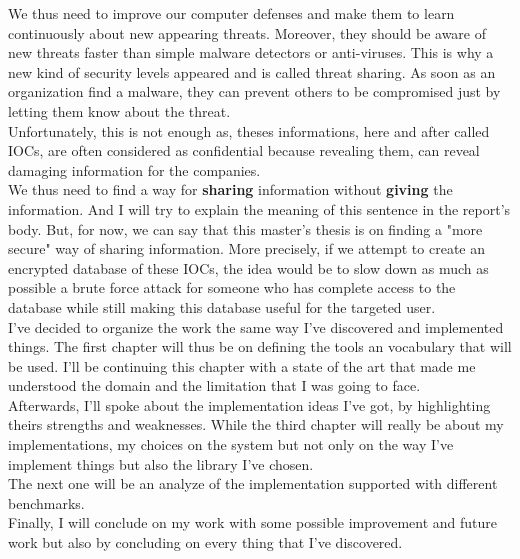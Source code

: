 \documentclass{eplmastersthesis}
\begin{document}
We thus need to improve our computer defenses and make them to learn continuously about new appearing threats. Moreover, they should be aware of new threats faster than simple malware detectors or anti-viruses. This is why a new kind of security levels appeared and is called threat sharing. As soon as an organization find a malware, they can prevent others to be compromised just by letting them know about the threat. \\
Unfortunately, this is not enough as, theses informations, here and after called IOCs, are often considered as confidential because revealing them, can reveal damaging information for the companies.\\
We thus need to find a way for \textbf{sharing} information without \textbf{giving} the information. And I will try to explain the meaning of this sentence in the report's body. But, for now, we can say that this master's thesis is on finding a "more secure" way of sharing information. More precisely, if we attempt to create an encrypted database of these IOCs, the idea would be to slow down as much as possible a brute force attack for someone who has complete access to the database while still making this database useful for the targeted user.\\

I've decided to organize the work the same way I've discovered and implemented things. The first chapter will thus be on defining the tools an vocabulary that will be used. I'll be continuing this chapter with a state of the art that made me understood the domain and the limitation that I was going to face.\\
Afterwards, I'll spoke about the implementation ideas I've got, by highlighting theirs strengths and weaknesses. While the third chapter will really be about my implementations, my choices on the system but not only on the way I've implement things but also the library I've chosen.\\
The next one will be an analyze of the implementation supported with different benchmarks.\\
Finally, I will conclude on my work with some possible improvement and future work but also by concluding on every thing that I've discovered.
\end{document}
